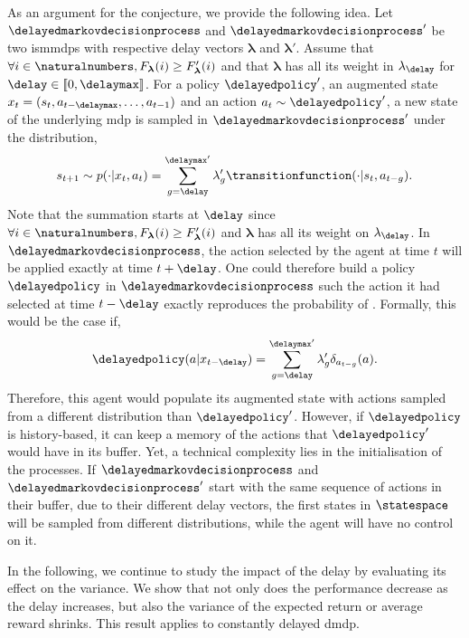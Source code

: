 As an argument for the conjecture, we provide the following idea. 
Let $\delayedmarkovdecisionprocess$ and $\delayedmarkovdecisionprocess'$ be two \glspl{ismmdp} with respective delay vectors $\boldsymbol\lambda$ and $\boldsymbol\lambda'$.
Assume that $\forall i\in\naturalnumbers, F_{\boldsymbol\lambda}(i) \ge F_{\boldsymbol\lambda}'(i)$ and that $\boldsymbol\lambda$ has all its weight in $\lambda_\delay$ for $\delay\in[\![0,\delaymax]\!]$. 
For a policy $\delayedpolicy'$, an augmented state $x_t=(s_t,a_{t-\delaymax},\dots,a_{t-1})$ and an action $a_{t}\sim\delayedpolicy'$, a new state of the underlying \gls{mdp} is sampled in $\delayedmarkovdecisionprocess'$ under the distribution,
\begin{align}
    s_{t+1}\sim p(\cdot\vert x_t,a_{t})= \sum_{g=\delay}^{\delaymax'}\lambda_g' \transitionfunction(\cdot\vert s_t,a_{t-g}).\label{eq:proba_trans_plus_delayed}
\end{align}
Note that the summation starts at $\delay$ since $\forall i\in\naturalnumbers, F_{\boldsymbol\lambda}(i) \ge F_{\boldsymbol\lambda}'(i)$ and $\boldsymbol\lambda$ has all its weight on $\lambda_\delay$.
In $\delayedmarkovdecisionprocess$, the action selected by the agent at time $t$ will be applied exactly at time $t+\delay$.
One could therefore build a policy $\delayedpolicy$ in $\delayedmarkovdecisionprocess$ such the action it had selected at time $t-\delay$ exactly reproduces the probability of . 
Formally, this would be the case if,
\begin{align*}
    \delayedpolicy(a\vert x_{t-\delay}) = \sum_{g=\delay}^{\delaymax'}\lambda_g'  \delta_{a_{t-g}}(a).
\end{align*}
Therefore, this agent would populate its augmented state with actions sampled from a different distribution than $\delayedpolicy'$.
However, if $\delayedpolicy$ is history-based, it can keep a memory of the actions that $\delayedpolicy'$  would have in its buffer. 
Yet, a technical complexity lies in the initialisation of the processes. 
If $\delayedmarkovdecisionprocess$ and $\delayedmarkovdecisionprocess'$ start with the same sequence of actions in their buffer, due to their different delay vectors, the first states in $\statespace$ will be sampled from different distributions, while the agent will have no control on it.

In the following, we continue to study the impact of the delay by evaluating its effect on the variance.
We show that not only does the performance decrease as the delay increases, but also the variance of the expected return or average reward shrinks. 
This result applies to constantly delayed \gls{dmdp}. 

